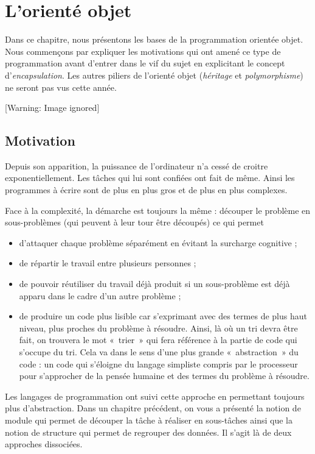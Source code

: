 \chapter[L'orienté objet]{
L'orienté objet}
{
Dans ce chapitre, nous présentons les bases de la programmation orientée
objet. Nous commençons par expliquer les motivations qui ont amené ce
type de programmation avant d'entrer dans le vif du
sujet en explicitant le concept
d'\textit{encapsulation}. Les autres piliers de
l'orienté objet (\textit{héritage} et
\textit{polymorphisme}) ne seront pas vus cette année.}

\begin{center}
 [Warning: Image ignored] %

\end{center}
\section{Motivation}
{
Depuis son apparition, la puissance de l'ordinateur
n'a cessé de croitre exponentiellement. Les tâches qui
lui sont confiées ont fait de même. Ainsi les programmes à écrire sont
de plus en plus gros et de plus en plus complexes.}

{
Face à la complexité, la démarche est toujours la même : découper le
problème en sous-problèmes (qui peuvent à leur tour être découpés) ce
qui permet}

\liststyleListv
\begin{itemize}
\item {
d'attaquer chaque problème séparément en évitant la
surcharge cognitive ;}
\item {
de répartir le travail entre plusieurs personnes ;}
\item {
de pouvoir réutiliser du travail déjà produit si un sous-problème est
déjà apparu dans le cadre d'un autre problème ;}
\item {
de produire un code plus lisible car s'exprimant avec
des termes de plus haut niveau, plus proches du problème à résoudre.
Ainsi, là où un tri devra être fait, on trouvera le mot «~trier~» qui
fera référence à la partie de code qui s’occupe du tri. Cela va dans le
sens d’une plus grande «~abstraction~» du code : un code qui s’éloigne
du langage simpliste compris par le processeur pour s’approcher de la
pensée humaine et des termes du problème à résoudre.}
\end{itemize}
{
Les langages de programmation ont suivi cette approche en permettant
toujours plus d’abstraction. Dans un chapitre précédent, on vous a
présenté la notion de module qui permet de découper la tâche à réaliser
en sous-tâches ainsi que la notion de structure qui permet de regrouper
des données. Il s'agit là de deux approches
dissociées. }

